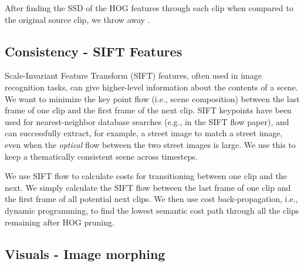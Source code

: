 After finding the SSD of the HOG features through each clip when compared to the original source clip, we throw away .

\subsection{Consistency - SIFT Features}

Scale-Invariant Feature Transform (SIFT) features, often used in image recognition tasks, can give higher-level information about the contents of a scene.  We want to minimize the key point flow (i.e., scene composition) between the last frame of one clip and the first frame of the next clip.  SIFT keypoints have been used for nearest-neighbor database searches (e.g., in the SIFT flow paper), and can successfully extract, for example, a street image to match a street image, even when the \emph{optical} flow between the two street images is large.  We use this to keep a thematically consistent scene across timesteps.

We use SIFT flow to calculate costs for transitioning between one clip and the next.  We simply calculate the SIFT flow between the last frame of one clip and the first frame of all potential next clips.  We then use cost back-propagation, i.e., dynamic programming, to find the lowest semantic cost path through all the clips remaining after HOG pruning.

\subsection{Visuals - Image morphing}

